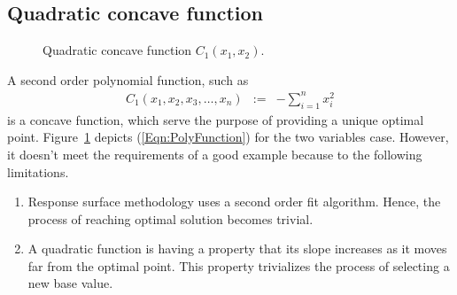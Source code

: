 \documentclass[twocolumn]{svjour3}          %
\begin{document}
\subsection{Quadratic concave function}
\begin{figure}
	\centering
	\label{Fig:TwoVariablePolynomial}
	\caption{Quadratic concave function $C_1(x_1, x_2)$.}
\end{figure}
A second order polynomial function, such as
\begin{eqnarray}
C_1(x_1, x_2, x_3, \dots, x_n) &:=& -\sum_{i=1}^{n}{x_i^2} \label{Eqn:PolyFunction}
\end{eqnarray}
is a concave function, which serve the purpose of providing a unique optimal point. Figure~\ref{Fig:TwoVariablePolynomial} depicts (\ref{Eqn:PolyFunction}) for the two variables case. However, it doesn't meet the requirements of a good example because to the following limitations.
\begin{enumerate}
	\item Response surface methodology uses a second order fit algorithm. Hence, the process of reaching optimal solution becomes trivial.
	\item A quadratic function is having a property that its slope increases as it moves far from the optimal point. This property trivializes the process of selecting a new base value.
\end{enumerate}
\end{document}
